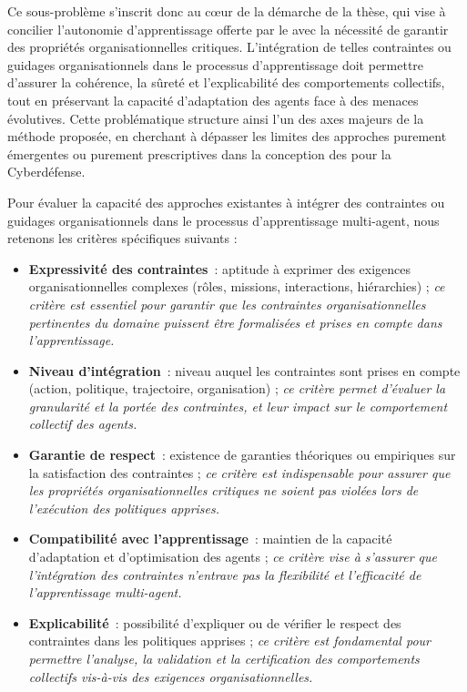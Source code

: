 Ce sous-problème s'inscrit donc au cœur de la démarche de la thèse, qui vise à concilier l'autonomie d'apprentissage offerte par le  avec la nécessité de garantir des propriétés organisationnelles critiques. L'intégration de telles contraintes ou guidages organisationnels dans le processus d'apprentissage doit permettre d'assurer la cohérence, la sûreté et l'explicabilité des comportements collectifs, tout en préservant la capacité d'adaptation des agents face à des menaces évolutives. Cette problématique structure ainsi l'un des axes majeurs de la méthode proposée, en cherchant à dépasser les limites des approches purement émergentes ou purement prescriptives dans la conception des  pour la Cyberdéfense.

Pour évaluer la capacité des approches existantes à intégrer des contraintes ou guidages organisationnels dans le processus d'apprentissage multi-agent, nous retenons les critères spécifiques suivants :
\begin{itemize}
  \item \textbf{Expressivité des contraintes}~: aptitude à exprimer des exigences organisationnelles complexes (rôles, missions, interactions, hiérarchies) ; \emph{ce critère est essentiel pour garantir que les contraintes organisationnelles pertinentes du domaine puissent être formalisées et prises en compte dans l'apprentissage.}
  \item \textbf{Niveau d'intégration}~: niveau auquel les contraintes sont prises en compte (action, politique, trajectoire, organisation) ; \emph{ce critère permet d'évaluer la granularité et la portée des contraintes, et leur impact sur le comportement collectif des agents.}
  \item \textbf{Garantie de respect}~: existence de garanties théoriques ou empiriques sur la satisfaction des contraintes ; \emph{ce critère est indispensable pour assurer que les propriétés organisationnelles critiques ne soient pas violées lors de l'exécution des politiques apprises.}
  \item \textbf{Compatibilité avec l'apprentissage}~: maintien de la capacité d'adaptation et d'optimisation des agents ; \emph{ce critère vise à s'assurer que l'intégration des contraintes n'entrave pas la flexibilité et l'efficacité de l'apprentissage multi-agent.}
  \item \textbf{Explicabilité}~: possibilité d'expliquer ou de vérifier le respect des contraintes dans les politiques apprises ; \emph{ce critère est fondamental pour permettre l'analyse, la validation et la certification des comportements collectifs vis-à-vis des exigences organisationnelles.}
\end{itemize}

